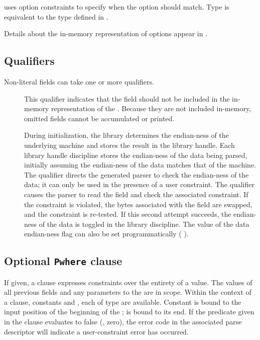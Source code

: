 %
\noindent
uses option constraints to specify when the option should match.
Type  is equivalent to the type  defined in
 .

Details about the in-memory representation of options appear in
.


\subsection{Qualifiers}
\label{sec:structs-qualifiers}
Non-literal fields can take one or more qualifiers.
\begin{description}
\item[\Pomit{}] This qualifier indicates that the field
  should not be included in the in-memory representation of the
  \Pstruct{}.  Because they are not included in-memory, omitted fields
  cannot be accumulated or printed.
\item[\Pendian{}] During initialization, the \PADS{} library
  determines the endian-ness of the underlying machine and stores the
  result in the library handle.  Each library handle discipline stores
  the endian-ness of the data being parsed, initially assuming the
  endian-ness of the data matches that of the machine.  The \Pendian{}
  qualifier directs the generated parser to check the endian-ness of
  the data; it can only be used in the presence of a user constraint.
  The qualifier causes the parser to read the field and check the
  associated constraint.  If the constraint is violated, the bytes
  associated with the field are swapped, and the constraint is
  re-tested.  If this second attempt succeeds, the endian-ness of the
  data is toggled in the library discipline.  The value of the data
  endian-ness flag can also be set programmatically (\cf
  ).
\end{description}


\subsection{Optional \texttt{Pwhere} clause}
If given, a \Pwhere{} clause expresses constraints over the entirety
of a \Pstruct{} value.  The values of all previous fields and any
parameters to the \Pstruct{} are in scope.  Within the context of a 
\Pparsecheck{} clause, constants  and , each of type 
\Ppost{} are available.  Constant  is bound to the input
position of the beginning of the \pstruct{};  is bound to its end.
If the predicate given in
the \Pwhere{} clause evaluates to false (\ie{}, zero), the error code
in the associated parse descriptor will indicate a user-constraint
error has occurred.  

